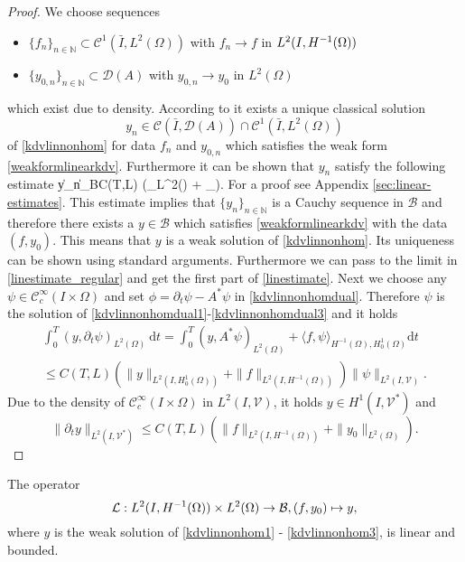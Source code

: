 \begin{proof}
We choose sequences
\begin{itemize}
  \item $\{f_n\}_{n\in\mathbb{N}}\subset\mathcal C^1(\bar I,L^2(\Omega))$ with $f_n\rightarrow f$ in $\Hm1$
  \item $\{y_{0,n}\}_{n\in\mathbb{N}}\subset\mathcal D(A)$ with $y_{0,n}\rightarrow y_0$ in $L^2(\Omega)$
\end{itemize}
which exist due to density. According to \cite[Part 2, Proposition 3.3]{bensoussan07} it exists a unique classical solution
\[y_n\in \mathcal C(\bar I,\mathcal D(A))\cap \mathcal C^1(\bar I,L^2(\Omega))\]
of \eqref{kdvlinnonhom} for data $f_n$ and $y_{0,n}$ which satisfies the weak form \eqref{weakformlinearkdv}. Furthermore it can be shown that $y_n$ satisfy the following estimate
\be
  \|y_n\|_{\mathcal B}\leq C(T,L) \left(_{L^{2}(\Omega)} + _{}\right).
  \label{linestimate_regular}
\ee
For a proof see Appendix \ref{sec:linear-estimates}.  This estimate implies that $\{y_n\}_{n\in \mathbb{N}}$ is a Cauchy sequence in $\mathcal B$ and therefore there exists a $y\in \mathcal B$ which satisfies \eqref{weakformlinearkdv} with the data $(f,y_0)$. This means that $y$ is a weak solution of \eqref{kdvlinnonhom}. Its uniqueness can be shown using standard arguments. Furthermore we can  pass to the limit in \eqref{linestimate_regular} and get the first part of \eqref{linestimate}. Next we choose any $\psi\in \mathcal C_c^{\infty}(I\times \Omega)$ and set $\phi=\partial_t\psi-A^*\psi$ in \eqref{kdvlinnonhomdual}. Therefore $\psi$ is the solution of \eqref{kdvlinnonhomdual1}-\eqref{kdvlinnonhomdual3} and it holds
\begin{multline*}
\int_0^T(y,\partial_t\psi)_{L^2(\Omega)}~\mathrm dt=\int_0^T(y,A^*\psi)_{L^2(\Omega)}+\langle f,\psi\rangle_{H^{-1}(\Omega),H^1_0(\Omega)}\mathrm dt\\
\leq C(T,L)\left(\|y\|_{L^2(I,H^1_0(\Omega))}+\|f\|_{L^2(I,H^{-1}(\Omega))}\right)\|\psi\|_{L^2(I,\mathcal V)}.
\end{multline*}
Due to the density of $\mathcal C_c^\infty(I\times \Omega)$ in $L^2(I,\mathcal V)$, it holds $y\in H^1(I,\mathcal V^*)$ and
\[\|\partial_t y\|_{L^2(I,\mathcal V^*)}\leq C(T,L)\left(\|f\|_{L^2(I,H^{-1}(\Omega))}+\|y_0\|_{L^2(\Omega)}\right).\]
\qquad\end{proof}

\begin{corollary}\label{rmklinearoperator}
The operator
\[
\mathcal{L}:\Hm1\times L^2(\Omega)\rightarrow \mathcal{B},(f,y_0) \mapsto y,
\]
where $y$ is the weak solution of \eqref{kdvlinnonhom1} - \eqref{kdvlinnonhom3}, is linear and bounded.
\end{corollary}
